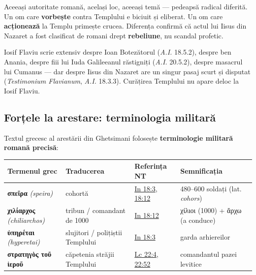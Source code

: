 \documentclass[12pt,a4paper,twoside,openany]{book}
\begin{document}
Aceeași autoritate romană, același loc, aceeași temă — pedeapsă radical diferită. Un om care \textbf{vorbește} contra Templului e biciuit și eliberat. Un om care \textbf{acționează} la Templu primește crucea. Diferența confirmă că actul lui Iisus din Nazaret a fost clasificat de romani drept \textbf{rebeliune}, nu scandal profetic.

Iosif Flaviu scrie extensiv despre Ioan Botezătorul (\textit{A.I.} 18.5.2), despre ben Anania, despre fiii lui Iuda Galileeanul răstigniți (\textit{A.I.} 20.5.2), despre masacrul lui Cumanus — dar despre Iisus din Nazaret are un singur pasaj scurt și disputat (\textit{Testimonium Flavianum}, \textit{A.I.} 18.3.3). Curățirea Templului nu apare deloc la Iosif Flaviu.

\subsection{Forțele la arestare: terminologia militară}

Textul grecesc al arestării din Ghetsimani folosește \textbf{terminologie militară romană precisă}:

\begin{center}
\small
\begin{tabularx}{\textwidth}{L{2.8cm}L{3.2cm}L{2.5cm}X}
\toprule
{}
\textbf{Termenul grec} & \textbf{Traducerea} & \textbf{Referința NT} & \textbf{Semnificația} \\
\midrule
\textbf{σπεῖρα} \textit{(speira)} & cohortă & \href{https://bibliaortodoxa.ro/carte.php?id=35\&cap=18\#3}{In 18:3}, \href{https://bibliaortodoxa.ro/carte.php?id=35\&cap=18\#12}{18:12} & 480--600 soldați (lat. \textit{cohors}) \\
\textbf{χιλίαρχος} \textit{(chiliarchos)} & tribun / comandant de 1000 & \href{https://bibliaortodoxa.ro/carte.php?id=35\&cap=18\#12}{In 18:12} & χίλιοι (1000) + ἄρχω (a conduce) \\
\textbf{ὑπηρέται} \textit{(hyperetai)} & slujitori / polițiștii Templului & \href{https://bibliaortodoxa.ro/carte.php?id=35\&cap=18\#3}{In 18:3} & garda arhiereilor \\
\textbf{στρατηγὸς τοῦ ἱεροῦ} & căpetenia străjii Templului & \href{https://bibliaortodoxa.ro/carte.php?id=48\&cap=22\#4}{Lc 22:4}, \href{https://bibliaortodoxa.ro/carte.php?id=48\&cap=22\#52}{22:52} & comandantul pazei levitice \\
\bottomrule
\end{tabularx}
\end{center}
\end{document}
